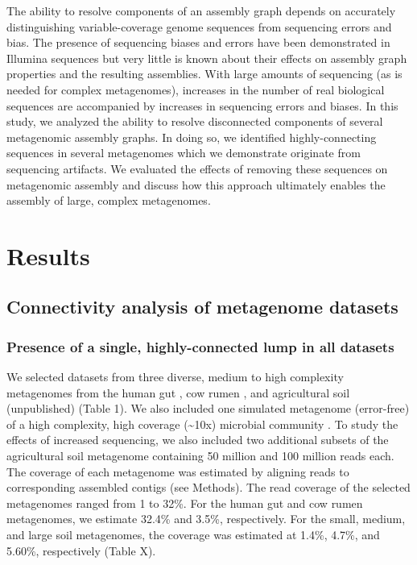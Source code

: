 \documentclass[11pt]{article} %
\begin{document}
The ability to resolve components of an assembly graph depends on accurately distinguishing variable-coverage genome sequences from sequencing errors and bias.  The presence of sequencing biases and errors have been demonstrated in Illumina sequences \cite{Harismendy:2009p228,Hoffmann:2009p1027,Nakamura:2011p741} but very little is known about their effects on assembly graph properties and the resulting assemblies.  With large amounts of sequencing (as is needed for complex metagenomes), increases in the number of real biological sequences are accompanied by increases in sequencing errors and biases.  In this study, we analyzed the ability to resolve disconnected components of several metagenomic assembly graphs.  In doing so, we identified highly-connecting sequences in several metagenomes which we demonstrate originate from sequencing artifacts.  We evaluated the effects of removing these sequences on metagenomic assembly and discuss how this approach ultimately enables the assembly of large, complex metagenomes.  

\section{Results}

\subsection{Connectivity analysis of metagenome datasets}

\subsubsection{Presence of a single, highly-connected lump in all datasets}
We selected datasets from three diverse, medium to high complexity metagenomes from the human gut \cite{Qin:2010p189}, cow rumen \cite{Hess:2011p686}, and agricultural soil (unpublished) (Table 1). We also included one simulated metagenome (error-free) of a high complexity, high coverage (\textasciitilde{}10x) microbial community \cite{Pignatelli:2011p742}. To study the effects of increased sequencing, we also included two additional subsets of the agricultural soil metagenome containing 50 million and 100 million reads each.   The coverage of each metagenome was estimated by aligning reads to corresponding assembled contigs (see Methods).  The read coverage of the selected metagenomes ranged from 1 to 32\%.   For the human gut and cow rumen metagenomes, we estimate 32.4\% and 3.5\%, respectively.  For the small, medium, and large soil metagenomes, the coverage was estimated at 1.4\%, 4.7\%, and 5.60\%, respectively (Table X).  
\end{document}
